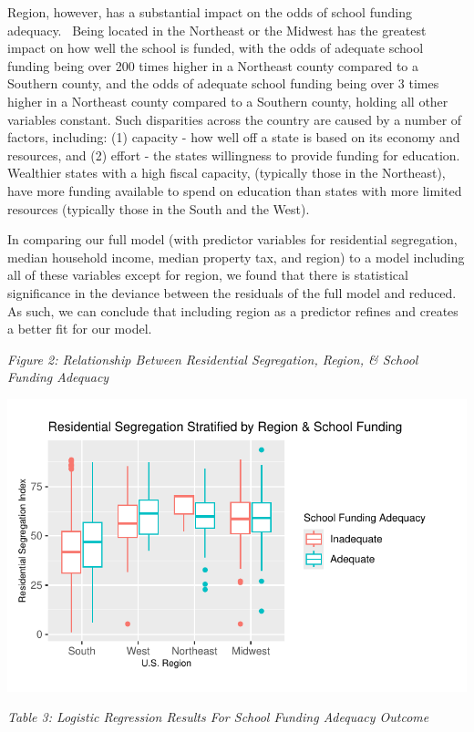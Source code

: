 \documentclass[
  10pt,
  letterpaper,
  DIV=11,
  numbers=noendperiod]{scrartcl}
\begin{document}
Region, however, has a substantial impact on the odds of school funding
adequacy.~ Being located in the Northeast or the Midwest has the
greatest impact on how well the school is funded, with the odds of
adequate school funding being over 200 times higher in a Northeast
county compared to a Southern county, and the odds of adequate school
funding being over 3 times higher in a Northeast county compared to a
Southern county, holding all other variables constant. Such disparities
across the country are caused by a number of factors, including: (1)
capacity - how well off a state is based on its economy and resources,
and (2) effort - the states willingness to provide funding for
education. Wealthier states with a high fiscal capacity, (typically
those in the Northeast), have more funding available to spend on
education than states with more limited resources (typically those in
the South and the West).~

In comparing our full model (with predictor variables for residential
segregation, median household income, median property tax, and region)
to a model including all of these variables except for region, we found
that there is statistical significance in the deviance between the
residuals of the full model and reduced. As such, we can conclude that
including region as a predictor refines and creates a better fit for our
model.

\emph{Figure 2: Relationship Between Residential Segregation, Region, \&
School Funding Adequacy}

\includegraphics{paper_files/figure-pdf/unnamed-chunk-22-1.pdf}

\emph{Table 3: Logistic Regression Results For School Funding Adequacy
Outcome}
\end{document}

